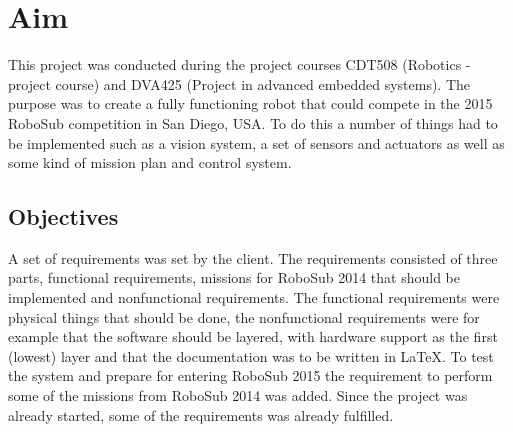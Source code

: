 \section{Aim}
This project was conducted during the project courses CDT508 (Robotics - project course) and DVA425 (Project in advanced embedded systems). The purpose was to create a fully functioning robot that could compete in the 2015 RoboSub competition in San Diego, USA. To do this a number of things had to be implemented such as a vision system, a set of sensors and actuators as well as some kind of mission plan and control system.
\subsection{Objectives}
\renewcommand{\labelenumi}{\arabic{enumi}.} 
\renewcommand{\labelenumii}{\arabic{enumi}.\arabic{enumii}}
\renewcommand{\labelenumiii}{\arabic{enumi}.\arabic{enumii}.\arabic{enumiii}}
A set of requirements was set by the client. The requirements consisted of three parts, functional requirements, missions for RoboSub 2014 that should be implemented and nonfunctional requirements. The functional requirements were physical things that should be done, the nonfunctional requirements were for example that the software should be layered, with hardware support as the first (lowest) layer and that the documentation was to be written in \LaTeX . To test the system and prepare for entering RoboSub 2015 the requirement to perform some of the missions from RoboSub 2014 was added. Since the project was already started, some of the requirements was already fulfilled. 

